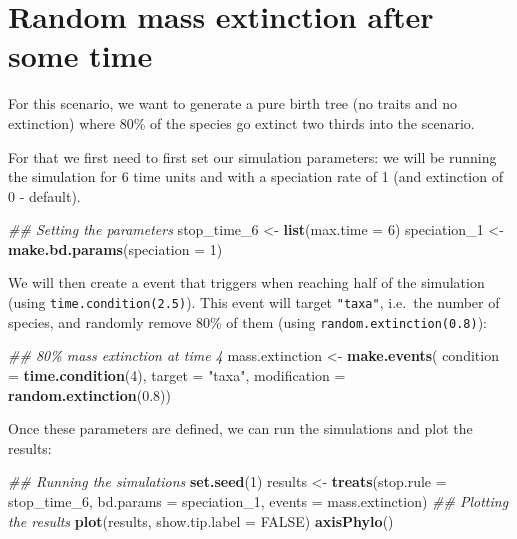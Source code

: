 \documentclass[
]{book}
\newenvironment{Shaded}{\begin{snugshade}}{\end{snugshade}}
\newcommand{\CommentTok}[1]{\textcolor[rgb]{0.56,0.35,0.01}{\textit{#1}}}
\newcommand{\DataTypeTok}[1]{\textcolor[rgb]{0.13,0.29,0.53}{#1}}
\newcommand{\DecValTok}[1]{\textcolor[rgb]{0.00,0.00,0.81}{#1}}
\newcommand{\FloatTok}[1]{\textcolor[rgb]{0.00,0.00,0.81}{#1}}
\newcommand{\KeywordTok}[1]{\textcolor[rgb]{0.13,0.29,0.53}{\textbf{#1}}}
\newcommand{\NormalTok}[1]{#1}
\newcommand{\OtherTok}[1]{\textcolor[rgb]{0.56,0.35,0.01}{#1}}
\newcommand{\StringTok}[1]{\textcolor[rgb]{0.31,0.60,0.02}{#1}}
\begin{document}
\hypertarget{EGrandom_ext}{%
\section{Random mass extinction after some time}\label{EGrandom_ext}}

For this scenario, we want to generate a pure birth tree (no traits and no extinction) where 80\% of the species go extinct two thirds into the scenario.

For that we first need to first set our simulation parameters: we will be running the simulation for 6 time units and with a speciation rate of 1 (and extinction of 0 - default).

\begin{Shaded}
\begin{Highlighting}[]
\CommentTok{\#\# Setting the parameters}
\NormalTok{stop\_time\_}\DecValTok{6}\NormalTok{ \textless{}{-}}\StringTok{ }\KeywordTok{list}\NormalTok{(}\DataTypeTok{max.time =} \DecValTok{6}\NormalTok{)}
\NormalTok{speciation\_}\DecValTok{1}\NormalTok{ \textless{}{-}}\StringTok{ }\KeywordTok{make.bd.params}\NormalTok{(}\DataTypeTok{speciation =} \DecValTok{1}\NormalTok{)}
\end{Highlighting}
\end{Shaded}

We will then create a event that triggers when reaching half of the simulation (using \texttt{time.condition(2.5)}).
This event will target \texttt{"taxa"}, i.e.~the number of species, and randomly remove 80\% of them (using \texttt{random.extinction(0.8)}):

\begin{Shaded}
\begin{Highlighting}[]
\CommentTok{\#\# 80\% mass extinction at time 4}
\NormalTok{mass.extinction \textless{}{-}}\StringTok{ }\KeywordTok{make.events}\NormalTok{(}
                    \DataTypeTok{condition =} \KeywordTok{time.condition}\NormalTok{(}\DecValTok{4}\NormalTok{),}
                    \DataTypeTok{target =} \StringTok{"taxa"}\NormalTok{,}
                    \DataTypeTok{modification =} \KeywordTok{random.extinction}\NormalTok{(}\FloatTok{0.8}\NormalTok{))}
\end{Highlighting}
\end{Shaded}

Once these parameters are defined, we can run the simulations and plot the results:

\begin{Shaded}
\begin{Highlighting}[]
\CommentTok{\#\# Running the simulations}
\KeywordTok{set.seed}\NormalTok{(}\DecValTok{1}\NormalTok{)}
\NormalTok{results \textless{}{-}}\StringTok{ }\KeywordTok{treats}\NormalTok{(}\DataTypeTok{stop.rule =}\NormalTok{ stop\_time\_}\DecValTok{6}\NormalTok{,}
                \DataTypeTok{bd.params =}\NormalTok{ speciation\_}\DecValTok{1}\NormalTok{,}
                \DataTypeTok{events    =}\NormalTok{ mass.extinction)}
\CommentTok{\#\# Plotting the results}
\KeywordTok{plot}\NormalTok{(results, }\DataTypeTok{show.tip.label =} \OtherTok{FALSE}\NormalTok{)}
\KeywordTok{axisPhylo}\NormalTok{()}
\end{Highlighting}
\end{Shaded}
\end{document}
